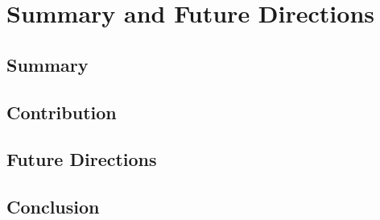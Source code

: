 
\chapter{\color{red}Summary and Future Directions}


\section{\color{red}Summary}


\section{\color{red}Contribution}


\section{\color{red}Future Directions}


\section{\color{red}Conclusion}

